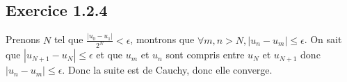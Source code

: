 \documentclass[]{book}
\theoremstyle{definition}
\begin{document}
\subsection*{Exercice 1.2.4}
Prenons $N$ tel que $\frac{|u_0-u_1|}{2^{N}} < \epsilon$, montrons que $\forall m,n > N, |u_n-u_m| \leq \epsilon$. On sait que $|u_{N+1}-u_N| \leq \epsilon$ et que $u_m$ et $u_n$ sont compris entre $u_{N}$ et $u_{N+1}$ donc $|u_n - u_m| \leq \epsilon$. Donc la suite est de Cauchy, donc elle converge.
\end{document}
